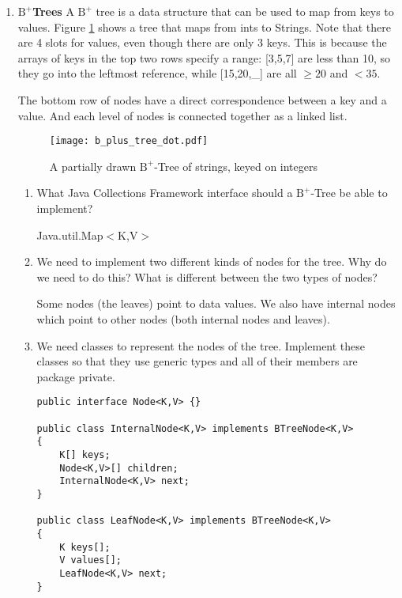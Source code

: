 \documentclass[11pt]{article}
\newenvironment{answer}{\large\lstset{basicstyle=\large}\color{white}}{}
\newenvironment{answer}{\large\lstset{basicstyle=\large}\color{red}}{}
\begin{document}
\begin{enumerate}
\item{\bf $\textrm{B}^+$Trees} A $\textrm{B}^+$ tree is a data structure that
can be used to map from keys to values. Figure \ref{b-tree} shows a tree that
maps from ints to Strings. Note that there are 4 slots for values, even though
there are only 3 keys. This is because the arrays of keys in the top two rows
specify a range: [3,5,7] are less than 10, so they go into the leftmost
reference, while [15,20,\_] are all $\geq 20$ and $<35$.

The bottom row of nodes have a direct correspondence between a key and a value.
And each level of nodes is connected together as a linked list.

\begin{figure}
\caption{A partially drawn $\textrm{B}^+$-Tree of strings, keyed on integers}
\label{b-tree}
\center
\texttt{[image: b\_plus\_tree\_dot.pdf]}
\end{figure}

    \begin{enumerate}
    \item What Java Collections Framework interface should a
    $\textrm{B}^+$-Tree be able to implement?

        \begin{answer}
        Java.util.Map$<$K,V$>$
        \end{answer}

    \item We need to implement two different kinds of nodes for the tree. Why
    do we need to do this? What is different between the two types of nodes?

        \begin{answer}
        Some nodes (the leaves) point to data values. We also have internal
        nodes which point to other nodes (both internal nodes and leaves).
        \end{answer}

    \item We need classes to represent the nodes of the tree. Implement these
    classes so that they use generic types and all of their members are package
    private.

\begin{answer}
\begin{lstlisting}
public interface Node<K,V> {}

public class InternalNode<K,V> implements BTreeNode<K,V>
{
    K[] keys;
    Node<K,V>[] children;
    InternalNode<K,V> next;
}

public class LeafNode<K,V> implements BTreeNode<K,V>
{
    K keys[];
    V values[];
    LeafNode<K,V> next;
}
\end{lstlisting}
\end{answer}

    \end{enumerate}

\end{enumerate}
\end{document}

